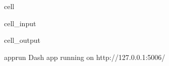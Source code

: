 \documentclass[letterpaper,10pt,english]{jupyterBook}
\begin{document}
\begin{sphinxuseclass}{cell}\begin{sphinxVerbatimInput}

\begin{sphinxuseclass}{cell_input}
\begin{sphinxVerbatim}[commandchars=\\\{\}]
    
      
   
\end{sphinxVerbatim}

\end{sphinxuseclass}\end{sphinxVerbatimInput}
\begin{sphinxVerbatimOutput}

\begin{sphinxuseclass}{cell_output}
\begin{sphinxVerbatim}[commandchars=\\\{\}]
apprun
Dash app running on http://127.0.0.1:5006/
\end{sphinxVerbatim}

\end{sphinxuseclass}\end{sphinxVerbatimOutput}

\end{sphinxuseclass}
\end{document}
